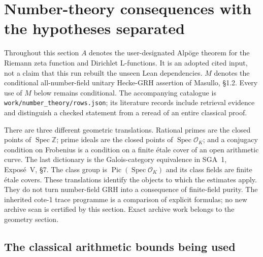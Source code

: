 \section{Number-theory consequences with the hypotheses separated}
\label{sec:number-theory}

Throughout this section $A$ denotes the user-designated Alp\"oge theorem
for the Riemann zeta function and Dirichlet L-functions.  It is an adopted
cited input, not a claim that this run rebuilt the unseen Lean dependencies.
$M$ denotes the conditional all-number-field unitary Hecke-GRH assertion
of Masullo, \S1.2.  Every use of $M$ below remains conditional.  The
accompanying catalogue is \texttt{work/number\_theory/rows.json}; its
literature records include retrieval evidence and distinguish a checked
statement from a reread of an entire classical proof.

There are three different geometric translations.  Rational primes are
the closed points of $\operatorname{Spec}\mathbb Z$; prime ideals are the
closed points of $\operatorname{Spec}\mathcal O_K$; and a conjugacy condition
on Frobenius is a condition on a finite \'{e}tale cover of an open arithmetic
curve.  The last dictionary is the Galois-category equivalence in SGA~1,
Expos\'e~V, \S7.  The class group is
$\operatorname{Pic}(\operatorname{Spec}\mathcal O_K)$ and its class fields
are finite \'{e}tale covers.  These translations identify the objects to
which the estimates apply.  They do not turn number-field GRH into a
consequence of finite-field purity.  The inherited cote-1 trace programme
is a comparison of explicit formulas; no new archive scan is certified by
this section.  Exact archive work belongs to the geometry section.

\subsection{The classical arithmetic bounds being used}

